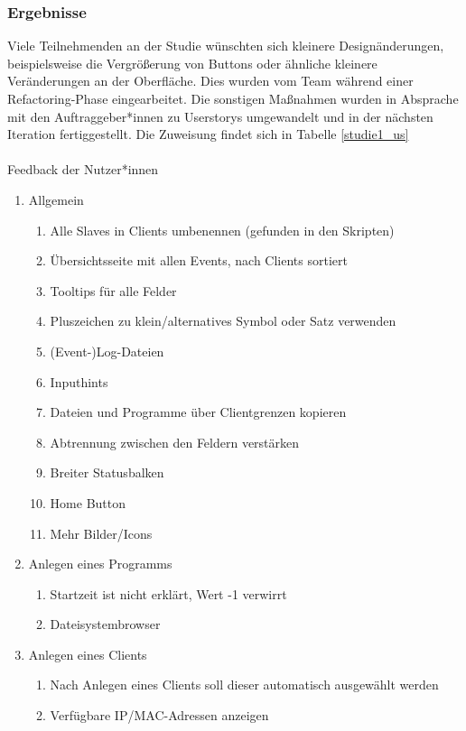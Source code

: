 \documentclass[accentcolor=tud9c,12pt,paper=a4]{tudreport}
\begin{document}
	\subsubsection{Ergebnisse}
	Viele Teilnehmenden an der Studie wünschten sich kleinere Designänderungen, beispielsweise die Vergrößerung von
	Buttons oder ähnliche kleinere Veränderungen an der Oberfläche. Dies wurden vom Team während einer Refactoring-Phase
	eingearbeitet. Die sonstigen Maßnahmen wurden in Absprache mit den Auftraggeber*innen zu Userstorys umgewandelt und
	in der nächsten Iteration fertiggestellt. Die Zuweisung findet sich in Tabelle \ref{studie1_us}
	\\\\
	{\large Feedback der Nutzer*innen\\}
	\begin{enumerate}
	\item Allgemein
	\begin{enumerate}
		\item Alle Slaves in Clients umbenennen (gefunden in den Skripten)
		\item Übersichtsseite mit allen Events, nach Clients sortiert
		\item Tooltips für alle Felder
		\item Pluszeichen zu klein/alternatives Symbol oder Satz verwenden
		\item (Event-)Log-Dateien
		\item Inputhints
		\item Dateien und Programme über Clientgrenzen kopieren
		\item Abtrennung zwischen den Feldern verstärken
		\item Breiter Statusbalken
		\item Home Button
		\item Mehr Bilder/Icons
	\end{enumerate}
	\item Anlegen eines Programms
	\begin{enumerate}
		\item Startzeit ist nicht erklärt, Wert -1 verwirrt
		\item Dateisystembrowser
	\end{enumerate}
	\item Anlegen eines Clients
	\begin{enumerate}
		\item Nach Anlegen eines Clients soll dieser automatisch ausgewählt werden
		\item Verfügbare IP/MAC-Adressen anzeigen

\end{enumerate}
\end{enumerate}
\end{document}

